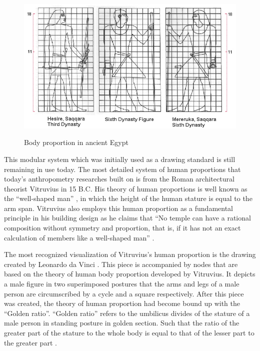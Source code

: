 \begin{figure}[ht]
    \centering
	\includegraphics[width=\columnwidth]{../images/threefigures}\\[1cm]
    \caption{Body proportion in ancient Egypt }
    \label{figure:fig1}
\end{figure}

This modular system which was initially used as a drawing standard is still remaining in use today. The most detailed system of human proportions that today's anthropometry researches built on is from the Roman architectural theorist Vitruvius in 15 B.C. His theory of human proportions is well known as the ``well-shaped man'' , in which the height of the human stature is  equal to the arm span. Vitruvius also employs this human proportion as a fundamental principle in his building design as he claims that ``No temple can have a rational composition without symmetry and proportion, that is, if it has not an exact calculation of members like a well-shaped man''  .

The most recognized visualization of Vitruvius's human proportion is the drawing created by Leonardo da Vinci . This piece is accompanied by nodes that are based on the theory of human body proportion developed by Vitruvius. It depicts a male figure in two superimposed postures that the arms and legs of a male person are circumscribed by a cycle and a square respectively. After this piece was created, the theory of human proportion had become bound up with the ``Golden ratio''. ``Golden ratio'' refers to the umbilicus divides of the stature of a male person in standing posture in golden section. Such that the ratio of the greater part of the stature to the whole body is equal to that of the lesser part to the greater part .

